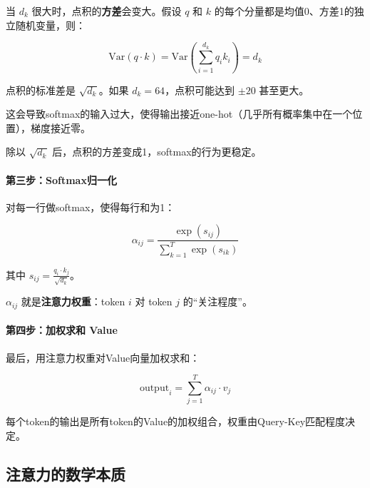当 $d_k$ 很大时，点积的\textbf{方差}会变大。假设 $q$ 和 $k$ 的每个分量都是均值0、方差1的独立随机变量，则：

\begin{equation}
    \text{Var}(q \cdot k) = \text{Var}\left(\sum_{i=1}^{d_k} q_i k_i\right) = d_k
\end{equation}

点积的标准差是 $\sqrt{d_k}$。如果 $d_k = 64$，点积可能达到 $\pm 20$ 甚至更大。

这会导致softmax的输入过大，使得输出接近one-hot（几乎所有概率集中在一个位置），梯度接近零。


除以 $\sqrt{d_k}$ 后，点积的方差变成1，softmax的行为更稳定。

\paragraph{第三步：Softmax归一化}

对每一行做softmax，使得每行和为1：

\begin{equation}
    \alpha_{ij} = \frac{\exp(s_{ij})}{\sum_{k=1}^{T} \exp(s_{ik})}
\end{equation}

其中 $s_{ij} = \frac{q_i \cdot k_j}{\sqrt{d_k}}$。

$\alpha_{ij}$ 就是\textbf{注意力权重}：token $i$ 对 token $j$ 的“关注程度”。

\paragraph{第四步：加权求和 Value}

最后，用注意力权重对Value向量加权求和：

\begin{equation}
    \text{output}_i = \sum_{j=1}^{T} \alpha_{ij} \cdot v_j
\end{equation}

每个token的输出是所有token的Value的加权组合，权重由Query-Key匹配程度决定。

\subsection{注意力的数学本质}


